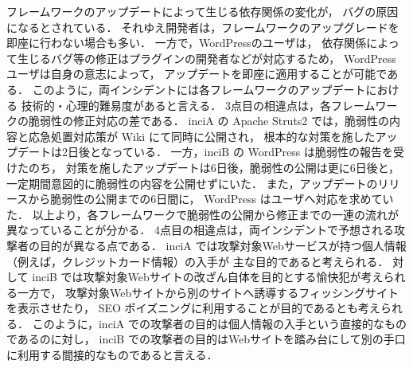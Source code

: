 \documentclass[uplatex]{jsarticle}
\begin{document}
フレームワークのアップデートによって生じる依存関係の変化が，
バグの原因になるとされている．
それゆえ開発者は，フレームワークのアップグレードを即座に行わない場合も多い．
一方で，WordPressのユーザは，
依存関係によって生じるバグ等の修正はプラグインの開発者などが対応するため，
WordPress ユーザは自身の意志によって，
アップデートを即座に適用することが可能である．
このように，両インシデントには各フレームワークのアップデートにおける
技術的・心理的難易度があると言える．
3点目の相違点は，各フレームワークの脆弱性の修正対応の差である．
inciA の Apache Struts2 では，脆弱性の内容と応急処置対応策が Wiki にて同時に公開され，
根本的な対策を施したアップデートは2日後となっている．
一方，inciB の WordPress は脆弱性の報告を受けたのち，
対策を施したアップデートは6日後，脆弱性の公開は更に6日後と，
一定期間意図的に脆弱性の内容を公開せずにいた．
また，アップデートのリリースから脆弱性の公開までの6日間に，
WordPress はユーザへ対応を求めていた．
以上より，各フレームワークで脆弱性の公開から修正までの一連の流れが異なっていることが分かる．
4点目の相違点は，両インシデントで予想される攻撃者の目的が異なる点である．
inciA では攻撃対象Webサービスが持つ個人情報（例えば，クレジットカード情報）の入手が
主な目的であると考えられる．
対して inciB では攻撃対象Webサイトの改ざん自体を目的とする愉快犯が考えられる一方で，
攻撃対象Webサイトから別のサイトへ誘導するフィッシングサイトを表示させたり，
SEO ポイズニングに利用することが目的であるとも考えられる．
このように，inciA での攻撃者の目的は個人情報の入手という直接的なものであるのに対し，
inciB での攻撃者の目的はWebサイトを踏み台にして別の手口に利用する間接的なものであると言える．



\end{document}
